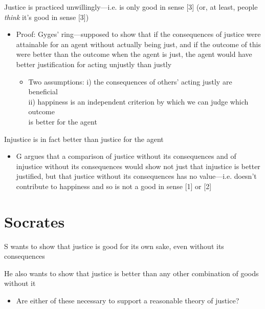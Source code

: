 \documentclass[11pt]{article}
\begin{document}
\noindent Justice is practiced unwillingly---i.e. is only good in sense [3] (or, at least, people \emph{think} it's good in sense [3])
\begin{itemize}\item{Proof: Gyges' ring---supposed to show that if the consequences of justice were attainable for an agent without actually being just, and if the outcome of this were better than the outcome when the agent is just, the agent would have better justification for acting unjustly than justly}\begin{itemize}\item{Two assumptions: i) the consequences of others' acting justly are beneficial\\\hspace*{28mm}ii) happiness is an independent criterion by which we can judge which outcome\\\hspace*{32mm}is better for the agent}\end{itemize}\end{itemize}

\noindent Injustice is in fact better than justice for the agent

\begin{itemize}\item{G argues that a comparison of justice without its consequences and of injustice without its consequences would show not just that injustice is better justified, but that justice without its consequences has no value---i.e. doesn't contribute to happiness and so is not a good in sense [1] or [2]}\end{itemize}
\vspace*{-8mm}

\section*{Socrates}

\noindent S wants to show that justice is good for its own sake, even without its consequences
\vspace*{2mm}

\noindent He also wants to show that justice is better than any other combination of goods without it
\begin{itemize}\item{Are either of these necessary to support a reasonable theory of justice?}\end{itemize}
\end{document}

